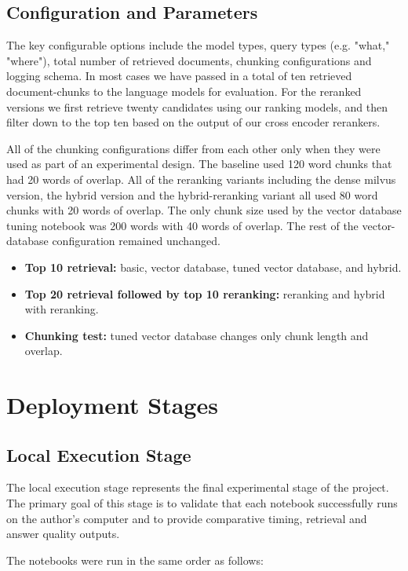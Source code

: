 \subsection{Configuration and Parameters}
The key configurable options include the model types, query types (e.g. "what," "where"), total number of retrieved documents, chunking configurations and logging schema. In most cases we have passed in a total of ten retrieved document-chunks to the language models for evaluation. For the reranked versions we first retrieve twenty candidates using our ranking models, and then filter down to the top ten based on the output of our cross encoder rerankers.

All of the chunking configurations differ from each other only when they were used as part of an experimental design. The baseline used 120 word chunks that had 20 words of overlap. All of the reranking variants including the dense milvus version, the hybrid version and the hybrid-reranking variant all used 80 word chunks with 20 words of overlap. The only chunk size used by the vector database tuning notebook was 200 words with 40 words of overlap. The rest of the vector-database configuration remained unchanged.

\begin{itemize}
    \item \textbf{Top 10 retrieval:} basic, vector database, tuned vector database, and hybrid.
    \item \textbf{Top 20 retrieval followed by top 10 reranking:} reranking and hybrid with reranking.
    \item \textbf{Chunking test:} tuned vector database changes only chunk length and overlap.
\end{itemize}

\section{Deployment Stages}

\subsection{Local Execution Stage}
The local execution stage represents the final experimental stage of the project. The primary goal of this stage is to validate that each notebook successfully runs on the author’s computer and to provide comparative timing, retrieval and answer quality outputs.

The notebooks were run in the same order as follows:

